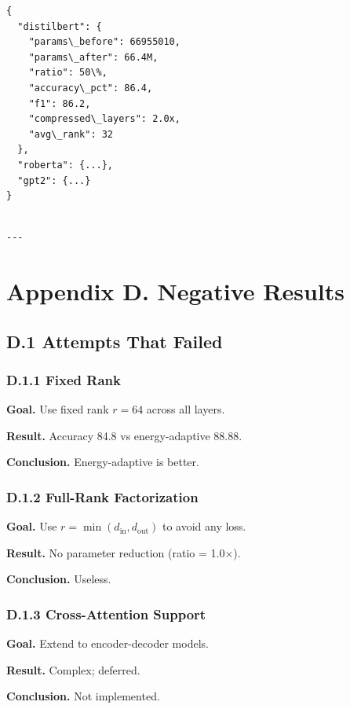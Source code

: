 \begin{lstlisting}
{
  "distilbert": {
    "params\_before": 66955010,
    "params\_after": 66.4M,
    "ratio": 50\%,
    "accuracy\_pct": 86.4,
    "f1": 86.2,
    "compressed\_layers": 2.0x,
    "avg\_rank": 32
  },
  "roberta": {...},
  "gpt2": {...}
}
\end{lstlisting}
\begin{lstlisting}

---
\end{lstlisting}


\section{Appendix D. Negative Results}

\subsection{D.1 Attempts That Failed}

\subsubsection{D.1.1 Fixed Rank}

\textbf{Goal.} Use fixed rank $r = 64$ across all layers.

\textbf{Result.} Accuracy 84.8 vs energy-adaptive 88.88.

\textbf{Conclusion.} Energy-adaptive is better.

\subsubsection{D.1.2 Full-Rank Factorization}

\textbf{Goal.} Use $r = \min(d_\text{in}, d_\text{out})$ to avoid any loss.

\textbf{Result.} No parameter reduction (ratio = 1.0$\times$).

\textbf{Conclusion.} Useless.

\subsubsection{D.1.3 Cross-Attention Support}

\textbf{Goal.} Extend to encoder-decoder models.

\textbf{Result.} Complex; deferred.

\textbf{Conclusion.} Not implemented.

